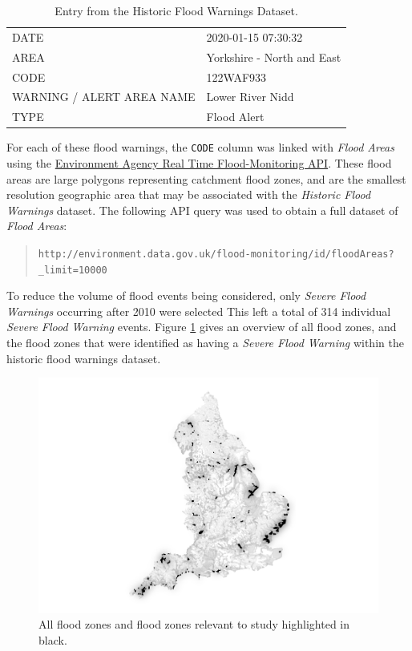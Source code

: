 \documentclass[a4paper, notitlepage]{extreport}
\begin{document}
\begin{table}

\caption{\label{tab:fw}Entry from the Historic Flood Warnings Dataset.}
\centering
\fontsize{9}{11}\selectfont
\begin{tabular}[t]{ll}
\toprule
DATE & 2020-01-15 07:30:32\\
AREA & Yorkshire - North and East\\
CODE & 122WAF933\\
WARNING / ALERT AREA NAME & Lower River Nidd\\
TYPE & Flood Alert\\
\bottomrule
\end{tabular}
\end{table}

For each of these flood warnings, the \texttt{CODE} column was linked
with \emph{Flood Areas} using the
\href{https://environment.data.gov.uk/flood-monitoring/doc/reference}{Environment
Agency Real Time Flood-Monitoring API}. These flood areas are large
polygons representing catchment flood zones, and are the smallest
resolution geographic area that may be associated with the
\emph{Historic Flood Warnings} dataset. The following API query was used
to obtain a full dataset of \emph{Flood Areas}:

\begin{quote}
\texttt{http://environment.data.gov.uk/flood-monitoring/id/floodAreas?\_limit=10000}
\end{quote}

To reduce the volume of flood events being considered, only \emph{Severe
Flood Warnings} occurring after 2010 were selected This left a total of
314 individual \emph{Severe Flood Warning} events. Figure \ref{fig:map}
gives an overview of all flood zones, and the flood zones that were
identified as having a \emph{Severe Flood Warning} within the historic
flood warnings dataset.

\begin{figure}[tb]

{\centering \includegraphics[width=.75\linewidth]{index_files/figure-latex/map-1} 

}

\caption{All flood zones and flood zones relevant to study highlighted in black.}\label{fig:map}
\end{figure}
\end{document}
